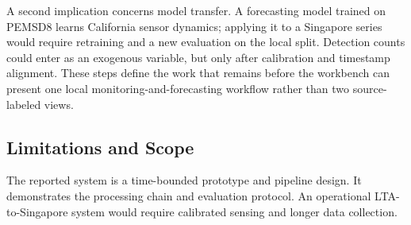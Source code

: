 A second implication concerns model transfer. A forecasting model trained on
PEMSD8 learns California sensor dynamics; applying it to a Singapore series
would require retraining and a new evaluation on the local split. Detection
counts could enter as an exogenous variable, but only after calibration and
timestamp alignment. These steps define the work that remains before the
workbench can present one local monitoring-and-forecasting workflow rather than
two source-labeled views.

\subsection{Limitations and Scope}\label{sec:discussion-limitations}

The reported system is a time-bounded prototype and pipeline design. It
demonstrates the processing chain and evaluation protocol. An operational
LTA-to-Singapore system would require calibrated sensing and longer data
collection.

